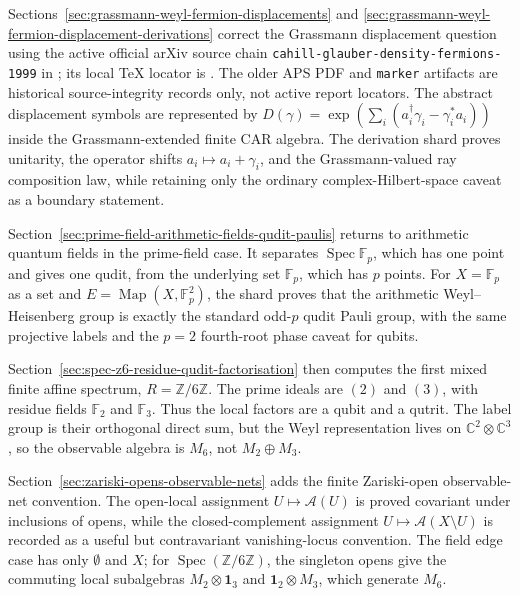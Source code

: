 Sections~\ref{sec:grassmann-weyl-fermion-displacements} and
\ref{sec:grassmann-weyl-fermion-displacement-derivations} correct the
Grassmann displacement question using the active official arXiv source chain
\texttt{cahill-glauber-density-fermions-1999} in ; its local TeX locator is .
The older APS PDF and \texttt{marker} artifacts are historical source-integrity records only, not active report locators.  The abstract displacement symbols are represented by
\(D(\gamma)=\exp(\sum_i(a_i^\dagger\gamma_i-\gamma_i^*a_i))\) inside the
Grassmann-extended finite CAR algebra.  The derivation shard proves unitarity,
the operator shifts \(a_i\mapsto a_i+\gamma_i\), and the Grassmann-valued ray
composition law, while retaining only the ordinary complex-Hilbert-space
caveat as a boundary statement.

Section~\ref{sec:prime-field-arithmetic-fields-qudit-paulis} returns to
arithmetic quantum fields in the prime-field case.  It separates
\(\operatorname{Spec}\mathbb F_p\), which has one point and gives one qudit,
from the underlying set \(\mathbb F_p\), which has \(p\) points.  For
\(X=\mathbb F_p\) as a set and \(E=\operatorname{Map}(X,\mathbb F_p^2)\), the
shard proves that the arithmetic Weyl--Heisenberg group is exactly the
standard odd-\(p\) qudit Pauli group, with the same projective labels and the
\(p=2\) fourth-root phase caveat for qubits.

Section~\ref{sec:spec-z6-residue-qudit-factorisation} then computes the first
mixed finite affine spectrum, \(R=\mathbb Z/6\mathbb Z\).  The prime ideals are
\((2)\) and \((3)\), with residue fields \(\mathbb F_2\) and \(\mathbb F_3\).
Thus the local factors are a qubit and a qutrit.  The label group is their
orthogonal direct sum, but the Weyl representation lives on
\(\mathbb C^2\otimes\mathbb C^3\), so the observable algebra is \(M_6\), not
\(M_2\oplus M_3\).

Section~\ref{sec:zariski-opens-observable-nets} adds the finite Zariski-open
observable-net convention.  The open-local assignment
\(U\mapsto\mathcal A(U)\) is proved covariant under inclusions of opens, while
the closed-complement assignment \(U\mapsto\mathcal A(X\setminus U)\) is
recorded as a useful but contravariant vanishing-locus convention.  The field
edge case has only \(\emptyset\) and \(X\); for
\(\operatorname{Spec}(\mathbb Z/6\mathbb Z)\), the singleton opens give the
commuting local subalgebras \(M_2\otimes\mathbf 1_3\) and
\(\mathbf 1_2\otimes M_3\), which generate \(M_6\).

